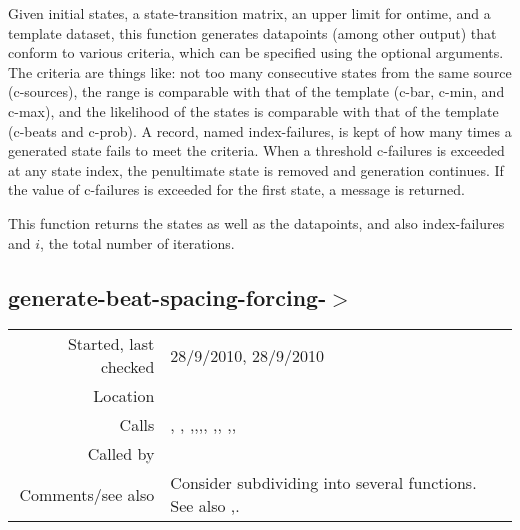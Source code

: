 \noindent Given initial states, a state-transition
matrix, an upper limit for ontime, and a template
dataset, this function generates datapoints (among
other output) that conform to various criteria, which
can be specified using the optional arguments. The
criteria are things like: not too many consecutive
states from the same source (c-sources), the range is
comparable with that of the template (c-bar, c-min,
and c-max), and the likelihood of the states is
comparable with that of the template (c-beats and
c-prob). A record, named index-failures, is kept of
how many times a generated state fails to meet the
criteria. When a threshold c-failures is exceeded at
any state index, the penultimate state is removed and
generation continues. If the value of c-failures is
exceeded for the first state, a message is
returned.

This function returns the states as well as the
datapoints, and also index-failures and $i$, the total
number of iterations.


\subsection*{generate-beat-spacing-forcing-$>$}\label{fun:generate-beat-spacing-forcing->}

\vspace{0.3cm}
\begin{tabular}{r|p{8cm}}
Started, last checked & 28/9/2010, 28/9/2010 \\
Location & \nameref{sec:generating-beat-MNN-spacing-forwards} \\
Calls & \nameref{fun:beat-spacing-states}, \nameref{fun:checklistp}, \nameref{fun:choose-one},\newline \nameref{fun:choose-one-with-beat},\newline \nameref{fun:geom-mean-likelihood-of-states},\newline \nameref{fun:index-1st-sublist-item>=}, \nameref{fun:my-last},\newline \nameref{fun:segments-strict}, \nameref{fun:sort-dataset-asc},\newline \nameref{fun:states2datapoints-by-lookup},\newline \nameref{fun:translate-datapoints-to-first-ontime} \\
Called by & \\
Comments/see also & Consider subdividing into several functions. See also \nameref{fun:generate-beat-MNN-spacing->},\newline \nameref{fun:generate-beat-spacing-forcing<-}.
\end{tabular}

